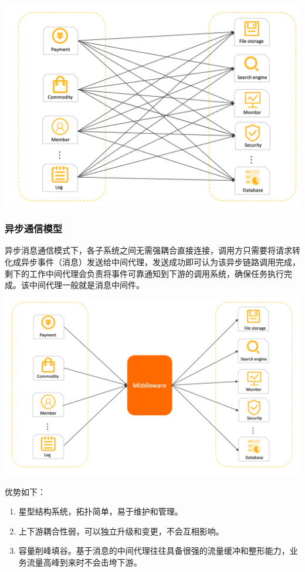 \documentclass[11pt, a4paper, oneside]{ctexbook}
\begin{document}
\begin{center}
  \begin{minipage}{\textwidth}
    \center
    \includegraphics[width=\textwidth]{picture/同步RPC调用模型.png}
    \captionsetup{hypcap=false}
    \label{fig:同步RPC调用模型}
  \end{minipage}
\end{center}

\subsubsection{异步通信模型}
异步消息通信模式下，各子系统之间无需强耦合直接连接，调用方只需要将请求转化成异步事件（消息）发送给中间代理，发送成功即可认为该异步链路调用完成，剩下的工作中间代理会负责将事件可靠通知到下游的调用系统，确保任务执行完成。该中间代理一般就是消息中间件。

\begin{center}
  \begin{minipage}{\textwidth}
    \center
    \includegraphics[width=\textwidth]{picture/异步通信模型.png}
    \captionsetup{hypcap=false}
    \label{fig:异步通信模型}
  \end{minipage}
\end{center}

优势如下：
\begin{enumerate}
  \item 星型结构系统，拓扑简单，易于维护和管理。
  \item 上下游耦合性弱，可以独立升级和变更，不会互相影响。
  \item 容量削峰填谷。基于消息的中间代理往往具备很强的流量缓冲和整形能力，业务流量高峰到来时不会击垮下游。
\end{enumerate}




\end{document}
